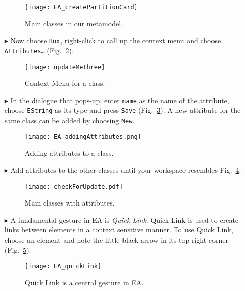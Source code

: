 \begin{enumerate}
\begin{figure}[htbp]
	\centering
  \texttt{[image: EA\_createPartitionCard]}
	\caption{Main classes in our metamodel.}
	\label{fig:all_eclasses}
\end{figure}

\item[$\blacktriangleright$] Now choose \texttt{Box}, right-click to call up the context menu and choose \texttt{Att\-ri\-butes\ldots} (Fig.~\ref{fig:attribute}).

\begin{figure}[htbp]
	\centering
  \texttt{[image: updateMeThree]}
	\caption{Context Menu for a class.}
	\label{fig:attribute}
\end{figure}
\FloatBarrier


\item[$\blacktriangleright$] In the dialogue that pops-up, enter \texttt{name} as the name of the attribute, choose \texttt{EString} as its type and press \texttt{Save} (Fig.~\ref{fig:attribute_properties}).
A new attribute for the same class can be added by choosing \texttt{New}.

\begin{figure}[htbp]
	\centering
  \texttt{[image: EA\_addingAttributes.png]}
	\caption{Adding attributes to a class.}
	\label{fig:attribute_properties}
\end{figure}

\item[$\blacktriangleright$] Add attributes to the other classes until your workspace resembles
Fig.~\ref{fig:attribute_completed}.

\begin{figure}[htbp]
	\centering
  \texttt{[image: checkForUpdate.pdf]}
	\caption{Main classes with attributes.}
	\label{fig:attribute_completed}
\end{figure}
\FloatBarrier

\item[$\blacktriangleright$] A fundamental gesture in EA is \emph{Quick Link}.
Quick Link is used to create links between elements in a context sensitive manner.
To use Quick Link, choose an element and note the little black arrow in its top-right corner (Fig.~\ref{fig:quicklink}).

\begin{figure}[htbp]
	\centering
  \texttt{[image: EA\_quickLink]}
	\caption{Quick Link is a central gesture in EA.}
	\label{fig:quicklink}
\end{figure}
\FloatBarrier


\end{enumerate}
